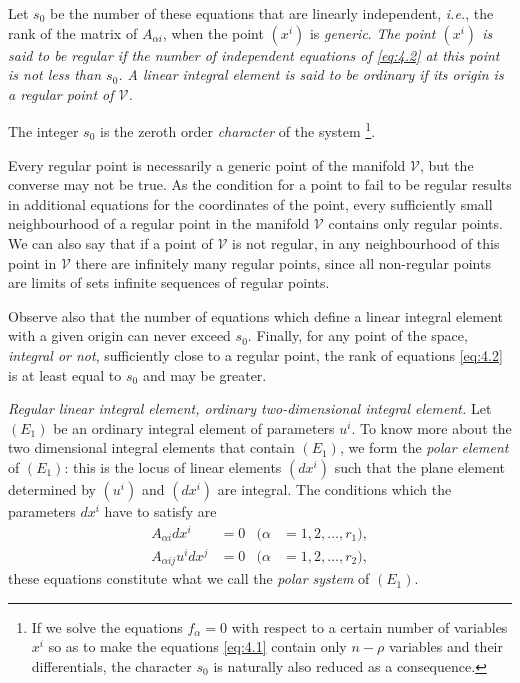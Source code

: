Let $s_{0}$ be the number of these equations that are linearly independent, \emph{i.e.}, the rank of the matrix of $A_{\alpha i}$, when the point $(x^{i})$ is \emph{generic}. \emph{The point $(x^{i})$ is said to be regular if  the number of independent equations of \eqref{eq:4.2} at this point is not less than $s_{0}$. A linear integral element is said to be ordinary if its origin is a regular point of $\mathcal{V}$.}

The integer $s_{0}$ is the zeroth order \emph{character}  of the system \footnote{If we solve the equations $f_\alpha=0$ with respect to a certain number of variables $x^{i}$ so as to make the equations \eqref{eq:4.1} contain only $n-\rho$ variables and their differentials, the character $s_{0}$ is naturally also reduced as a consequence.}.

Every regular point is necessarily a generic point of the manifold $\mathcal{V}$, but the converse may not be true. As the condition for a point to fail to be regular results in additional equations for the coordinates of the point, every sufficiently small neighbourhood of a regular point in the manifold $\mathcal{V}$ contains only regular points. We can also say that if a point of $\mathcal{V}$ is not regular, in any neighbourhood of this point in $\mathcal{V}$ there are infinitely many regular points, since all non-regular points are limits of sets infinite sequences of regular points.

Observe also that the number of equations which define a linear integral element with a given origin can never exceed $s_{0}$. Finally, for any point of the space, \emph{integral or not}, sufficiently close to a regular point, the rank of equations \eqref{eq:4.2} is at least equal to $s_{0}$ and may be greater.

\vspace{12pt}\fsec \emph{Regular linear integral element, ordinary two-dimensional integral element.} Let $(E_{1})$ be an ordinary integral element of parameters $u^{i}$. To know more about the two dimensional integral elements that contain $(E_{1})$,  we  form the \emph{polar element} of $(E_{1})$: this is the locus of linear elements $(dx^{i}
)$ such that the plane element determined by $(u^{i})$ and $(dx^{i})$ are integral. The conditions which the parameters $dx^{i}$ have to satisfy are
\begin{align}
  \label{eq:4.3}
  A_{\alpha i}dx^{i}&=0&(\alpha&=1,2,\dots,r_{1}),\\
  \label{eq:4.4}
  A_{\alpha ij}u^{i}dx^{j}&=0&(\alpha&=1,2,\dots,r_{2}),
\end{align}
these equations constitute what we call the \emph{polar system} of $(E_{1})$.

